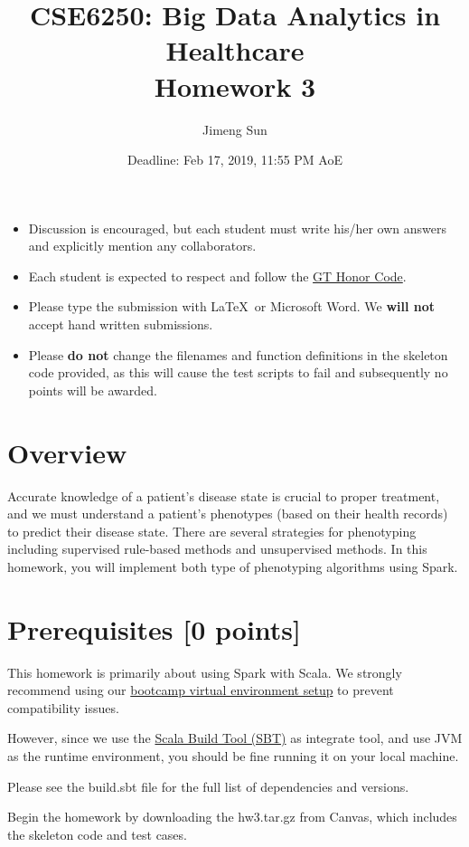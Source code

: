 \documentclass[12pt]{article}
\title{CSE6250: Big Data Analytics in Healthcare \\ Homework 3}
\author{Jimeng Sun}
\date{Deadline: Feb 17, 2019, 11:55 PM AoE}
\begin{document}
\maketitle
\begin{itemize}
\item Discussion is encouraged, but each student must write his/her own answers and explicitly mention any collaborators.
\item Each student is expected to respect and follow the \href{http://osi.gatech.edu/content/honor-code}{ GT Honor Code}.
\item Please type the submission with \LaTeX\ or Microsoft Word. We \textbf{will not} accept hand written submissions.
\item Please \textbf{do not} change the filenames and function definitions in the skeleton code provided, as this will cause the test scripts to fail and subsequently no points will be awarded. 
\end{itemize}


\section*{Overview}
Accurate knowledge of a patient's disease state is crucial to proper treatment, and we must understand a patient's phenotypes (based on their health records) to predict their disease state. There are several strategies for phenotyping including supervised rule-based methods and unsupervised methods. In this homework, you will implement both type of phenotyping algorithms using Spark.

\section*{Prerequisites [0 points]}
This homework is primarily about using Spark with Scala. We strongly recommend using our \href{http://www.sunlab.org/teaching/cse6250/spring2019/env}{bootcamp virtual environment setup} to prevent compatibility issues.

However, since we use the \href{http://www.scala-sbt.org/}{Scala Build Tool (SBT)} as integrate tool, and use JVM as the runtime environment, you should be fine running it on your local machine.

Please see the build.sbt file for the full list of dependencies and versions.

Begin the homework by downloading the hw3.tar.gz from Canvas, which includes the skeleton code and test cases. 
\end{document}
